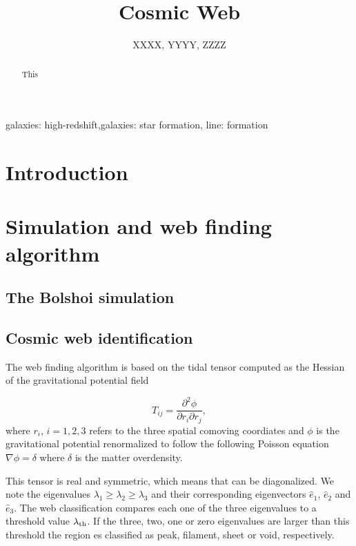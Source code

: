 \documentclass{emulateapj}
\begin{document}
\title{Cosmic Web} 
\author{
  XXXX,
  YYYY,
  ZZZZ
}

\begin{abstract}
This
\end{abstract}

\begin{keywords}
{galaxies: high-redshift,galaxies: star formation, line: formation}
\end{keywords}


\section{Introduction}
\label{sec:intro}

\section{Simulation and web finding algorithm}
\label{sec:Simulation}

\subsection{The Bolshoi simulation}


\subsection{Cosmic web identification}
The web finding algorithm is based on the tidal tensor computed as the
Hessian of the  gravitational potential field

\begin{equation}
T_{ij} = \frac{\partial^2 \phi}{\partial r_i \partial r_j}, 
\end{equation}
where $r_{i}$, $i=1,2,3$ refers to the three spatial comoving
coordiates and $\phi$ is the gravitational potential renormalized to
follow the following Poisson equation $\nabla\phi=\delta$ where
$\delta$ is the matter overdensity.  

This tensor is real and symmetric, which means that can be
diagonalized. We note the eigenvalues $\lambda_1\geq \lambda_2\geq
\lambda_3$ and their corresponding eigenvectors $\hat{e}_1$,
$\hat{e}_2$ and $\hat{e}_3$. The web classification compares each one
of the three eigenvalues to a threshold value $\lambda_{\rm th}$. If the three, two, one or zero eigenvalues are larger than this threshold the region es classified as peak, filament, sheet or void, respectively. 
\end{document}

